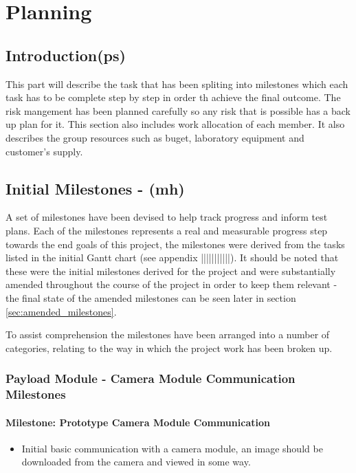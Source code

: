 \chapter{Planning}

\section{Introduction(ps)}
This part will describe the task that has been spliting into milestones which each task has to be complete step by step in order th achieve the final outcome.
The risk mangement has been planned carefully so any risk that is possible has a back up plan for it.
This section also includes work allocation of each member.
It also describes the group resources such as buget, laboratory equipment and customer's supply. 
\section{Initial Milestones - (mh)}
\label{sec:initial_milestones}
A set of milestones have been devised to help track progress and inform test plans.
Each of the milestones represents a real and measurable progress step towards the 
end goals of this project, the milestones were derived from the tasks listed in the initial
Gantt chart (see appendix |||||||||||). It should be noted that these were the initial
milestones derived for the project and were substantially amended throughout the course of
the project in order to keep them relevant - the final state of the amended milestones
can be seen later in section \ref{sec:amended_milestones}.

To assist comprehension the milestones have been arranged into a number of categories,
relating to the way in which the project work has been broken up.

\subsection{Payload Module - Camera Module Communication Milestones}
	\subsubsection{Milestone: Prototype Camera Module Communication}
	\label{sec:ms_init_prototype_camera_module_comms}
		\begin{itemize}
			\item 	Initial basic communication with a camera module, an image should be
				downloaded from the camera and viewed in some way.
		\end{itemize}

